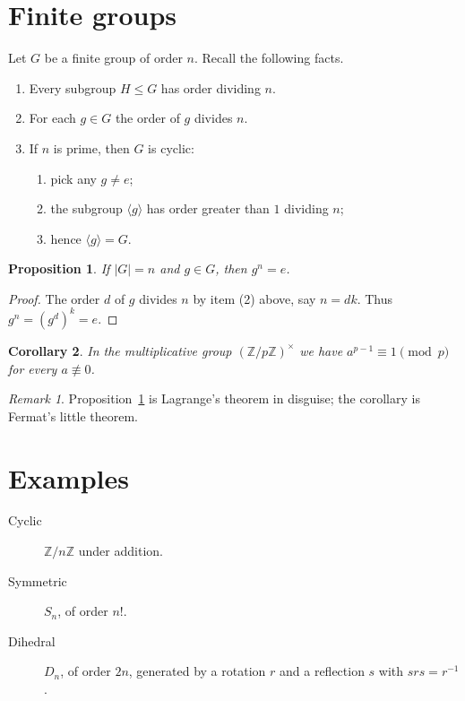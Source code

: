 \documentclass[12pt,a4paper]{article}
\newtheorem{proposition}{Proposition}[section]
\newtheorem{corollary}[proposition]{Corollary}
\theoremstyle{remark}
\newtheorem*{remark}{Remark}
\begin{document}
\section{Finite groups}
Let $G$ be a finite group of order $n$. Recall the following facts.
\begin{enumerate}
\item Every subgroup $H\le G$ has order dividing $n$.
\item For each $g\in G$ the order of $g$ divides $n$.
\item If $n$ is prime, then $G$ is cyclic:
  \begin{enumerate}
  \item pick any $g\ne e$;
  \item the subgroup $\langle g\rangle$ has order greater than $1$ dividing $n$;
  \item hence $\langle g\rangle=G$.
  \end{enumerate}
\end{enumerate}

\begin{proposition}\label{prop:lagrange}
If $|G|=n$ and $g\in G$, then $g^n=e$.
\end{proposition}
\begin{proof}
The order $d$ of $g$ divides $n$ by item (2) above, say $n=dk$. Thus $g^n=(g^d)^k=e$.
\end{proof}

\begin{corollary}
In the multiplicative group $(\mathbb{Z}/p\mathbb{Z})^\times$ we have $a^{p-1}\equiv1\pmod p$ for every $a\not\equiv0$.
\end{corollary}

\begin{remark}
Proposition~\ref{prop:lagrange} is Lagrange's theorem in disguise; the corollary is Fermat's little theorem.
\end{remark}

\section{Examples}
\begin{description}
\item[Cyclic] $\mathbb{Z}/n\mathbb{Z}$ under addition.
\item[Symmetric] $S_n$, of order $n!$.
\item[Dihedral] $D_n$, of order $2n$, generated by a rotation $r$ and a reflection $s$ with $srs=r^{-1}$.
\end{description}
\end{document}
